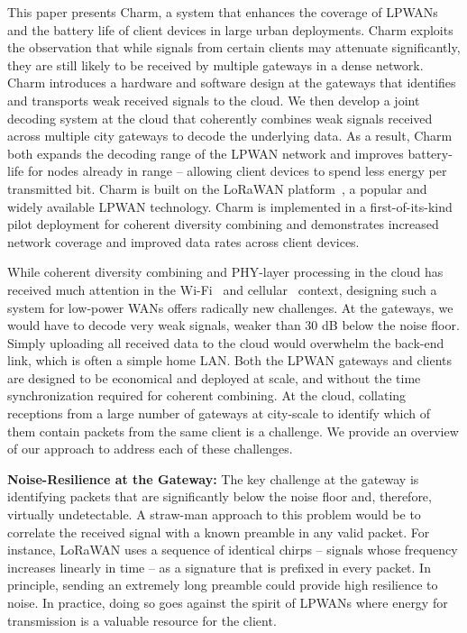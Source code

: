 This paper presents Charm, a system that enhances the coverage of LPWANs and
the battery life of client devices in large urban deployments. Charm exploits
the observation that while signals from certain clients may attenuate
significantly, they are still likely to be received by multiple gateways in a
dense network. Charm introduces a hardware and software design at the gateways
that identifies and transports weak received signals to the cloud. We then
develop a joint decoding system at the cloud that coherently combines weak
signals received across multiple city gateways to decode the underlying data.
As a result, Charm both expands the decoding range of the LPWAN network and
improves battery-life for nodes already in range -- allowing client devices to
spend less energy per transmitted bit. Charm is built on the LoRaWAN
platform~\cite{LoRaWanAlliance2015}, a popular and widely available LPWAN
technology. Charm is implemented in a first-of-its-kind pilot deployment for
coherent diversity combining and demonstrates increased network coverage and
improved data rates across client devices.

While coherent diversity combining and PHY-layer processing in the cloud has
received much attention in the Wi-Fi~\cite{tan2009sam, xie2014scalable} and
cellular~\cite{checko2015cloud, wubben2014benefits} context, designing such a
system for low-power WANs offers radically new challenges. At the gateways, we
would have to decode very weak signals, weaker than 30 dB below the noise
floor. Simply uploading all received data to the cloud would overwhelm
the back-end link, which is often  a simple home LAN. Both the LPWAN gateways
and clients are designed to be economical and deployed at scale, and without
the time synchronization required for coherent combining. At the cloud,
collating receptions from a large number of gateways at city-scale to identify
which of them contain packets from the same client is a challenge. We provide
an overview of our approach to address each of these challenges.

\noindent \textbf{Noise-Resilience at the Gateway:} The key challenge at the
gateway is identifying packets that are significantly below the noise floor
and, therefore, virtually undetectable. A straw-man approach to this problem
would be to correlate the received signal with a known preamble in any valid
packet. For instance, LoRaWAN uses a sequence of identical chirps -- signals
whose frequency increases linearly in time -- as a signature that is prefixed
in every packet. In principle, sending an extremely long preamble could
provide high resilience to noise. In practice, doing so goes against the
spirit of LPWANs where energy for transmission is a valuable resource for the
client.


